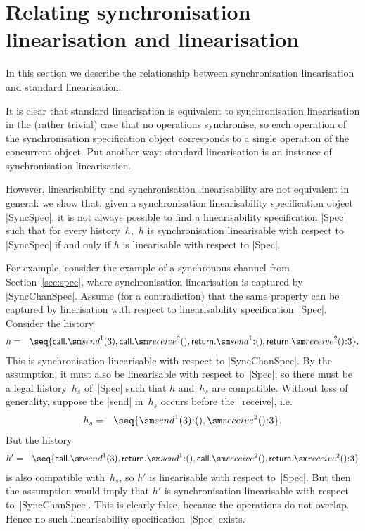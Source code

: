\section{Relating synchronisation linearisation and linearisation}
\label{sec:relating}

In this section we describe the relationship between synchronisation
linearisation and standard linearisation.  

It is clear that standard linearisation is equivalent to synchronisation
linearisation in the (rather trivial) case that no operations synchronise, so
each operation of the synchronisation specification object corresponds to a
single operation of the concurrent object.  Put another way: standard
linearisation is an instance of synchronisation linearisation. 


However, linearisability and synchronisation linearisability are not
equivalent in general: we show that, given a synchronisation linearisability
specification object |SyncSpec|, it is not always possible to find a
linearisability specification |Spec| such that for every history~$h$,\, $h$ is
synchronisation linearisable with respect to |SyncSpec| if and only if $h$ is
linearisable with respect to |Spec|.

For example, consider the example of a synchronous channel from
Section~\ref{sec:spec}, where synchronisation linearisation is captured by
|SyncChanSpec|.  Assume (for a contradiction) that the same property can be
captured by linerisation with respect to linearisability specification~|Spec|.
Consider the history
\begin{eqnarray*}
h & = & \seq{ 
  \call.\send^1(3), \call.\receive^2(), 
  \return.\send^1\::(), \return.\receive^2()\::3 }.
\end{eqnarray*}
%
This is synchronisation linearisable with respect to |SyncChanSpec|.  By the
assumption, it must also be linearisable with respect to~|Spec|; so there must
be a legal history~$h_s$ of~|Spec| such that $h$ and~$h_s$ are compatible.
Without loss of generality, suppose the |send| in~$h_s$ occurs before
the~|receive|, i.e.
\begin{eqnarray*}
h_s & = & \seq{ \send^1(3)\::(), \receive^2()\::3 }.
\end{eqnarray*}
%
But the history
%
\begin{eqnarray*}
h' & = & \seq{ 
  \call.\send^1(3), \return.\send^1\::(), 
  \call.\receive^2(), \return.\receive^2()\::3 }
\end{eqnarray*}
%
is also compatible with~$h_s$, so $h'$ is linearisable with respect to~|Spec|.
But then the assumption would imply that $h'$ is synchronisation linearisable
with respect to~|SyncChanSpec|.  This is clearly false, because the operations
do not overlap.  Hence no such linearisability specification~|Spec| exists.


